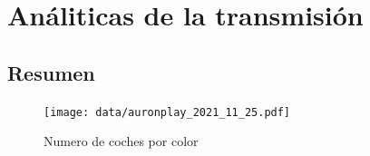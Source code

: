 \documentclass[a4paper,10pt,twoside]{report}
\begin{document}
\chapter{Análiticas de la transmisión}
\thispagestyle{fancy}
\section{Resumen}
\blindtext
\begin{figure}[H]
   \centering
   \texttt{[image: data/auronplay\_2021\_11\_25.pdf]}
   \caption{Numero de coches por color}
   \end{figure}
\end{document}
